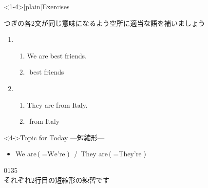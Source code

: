 \documentclass[aspectratio=169,xcolor={dvipsnames,table}]{beamer}
\begin{document}
%
\begin{frame}<1-4>[plain]{Exercises}

 {\small つぎの各2文が同じ意味になるよう空所に適当な語を補いましょう}

\begin{enumerate}
 \item \begin{enumerate}
	\item We are best friends.
	\item {}\,\,best friends
       \end{enumerate}
 \item \begin{enumerate}
	\item They are from Italy.
	\item {}\,\,from Italy        \end{enumerate}
\end{enumerate}

\vfill

\begin{block}<4->{Topic for Today ---短縮形---}
\begin{itemize}[square]
 \item We are\,($=\text{We're}$)\,\,\,\,/\,\,\,They are\,($=\text{They're}$)
\end{itemize}
     \end{block}


\hfill{\tiny 0135}\,{\scriptsize {}}\\
\hfill{\scriptsize それぞれ2行目の短縮形の練習です}

\end{frame}
\end{document}
